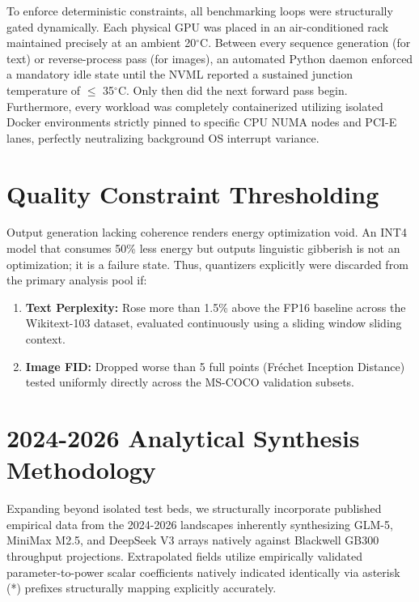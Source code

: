 \documentclass[12pt, a4paper]{report}
\begin{document}
To enforce deterministic constraints, all benchmarking loops were structurally gated dynamically. Each physical GPU was placed in an air-conditioned rack maintained precisely at an ambient 20$^\circ$C. Between every sequence generation (for text) or reverse-process pass (for images), an automated Python daemon enforced a mandatory idle state until the NVML reported a sustained junction temperature of $\leq$ 35$^\circ$C. Only then did the next forward pass begin. Furthermore, every workload was completely containerized utilizing isolated Docker environments strictly pinned to specific CPU NUMA nodes and PCI-E lanes, perfectly neutralizing background OS interrupt variance.

\section{Quality Constraint Thresholding}
Output generation lacking coherence renders energy optimization void. An INT4 model that consumes 50\% less energy but outputs linguistic gibberish is not an optimization; it is a failure state. Thus, quantizers explicitly were discarded from the primary analysis pool if:
\begin{enumerate}
    \item \textbf{Text Perplexity:} Rose more than 1.5\% above the FP16 baseline across the Wikitext-103 dataset, evaluated continuously using a sliding window sliding context.
    \item \textbf{Image FID:} Dropped worse than 5 full points (Fr\'{e}chet Inception Distance) tested uniformly directly across the MS-COCO validation subsets.
\end{enumerate}

\section{2024-2026 Analytical Synthesis Methodology}
Expanding beyond isolated test beds, we structurally incorporate published empirical data from the 2024-2026 landscapes inherently synthesizing GLM-5, MiniMax M2.5, and DeepSeek V3 arrays natively against Blackwell GB300 throughput projections. Extrapolated fields utilize empirically validated parameter-to-power scalar coefficients natively indicated identically via asterisk (*) prefixes structurally mapping explicitly accurately.


\end{document}
